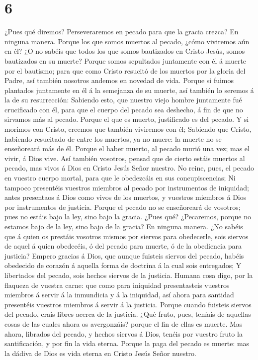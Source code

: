 \hypertarget{section-5}{%
\section{6}\label{section-5}}

 ¿Pues qué diremos? Perseveraremos en pecado para que la
gracia crezca?  En ninguna manera. Porque los que somos
muertos al pecado, ¿cómo viviremos aún en él?  ¿O no
sabéis que todos los que somos bautizados en Cristo Jesús, somos
bautizados en su muerte?  Porque somos sepultados
juntamente con él á muerte por el bautismo; para que como Cristo
resucitó de los muertos por la gloria del Padre, así también nosotros
andemos en novedad de vida.  Porque si fuimos plantados
juntamente en él á la semejanza de su muerte, así también lo seremos á
la de su resurrección:  Sabiendo esto, que nuestro viejo
hombre juntamente fué crucificado con él, para que el cuerpo del pecado
sea deshecho, á fin de que no sirvamos más al pecado. 
Porque el que es muerto, justificado es del pecado.  Y si
morimos con Cristo, creemos que también viviremos con él; 
Sabiendo que Cristo, habiendo resucitado de entre los muertos, ya no
muere: la muerte no se enseñoreará más de él.  Porque el
haber muerto, al pecado murió una vez; mas el vivir, á Dios vive.
 Así también vosotros, pensad que de cierto estáis
muertos al pecado, mas vivos á Dios en Cristo Jesús Señor nuestro.
 No reine, pues, el pecado en vuestro cuerpo mortal, para
que le obedezcáis en sus concupiscencias;  Ni tampoco
presentéis vuestros miembros al pecado por instrumentos de iniquidad;
antes presentaos á Dios como vivos de los muertos, y vuestros miembros á
Dios por instrumentos de justicia.  Porque el pecado no
se enseñoreará de vosotros; pues no estáis bajo la ley, sino bajo la
gracia.  ¿Pues qué? ¿Pecaremos, porque no estamos bajo de
la ley, sino bajo de la gracia? En ninguna manera.  ¿No
sabéis que á quien os prestáis vosotros mismos por siervos para
obedecerle, sois siervos de aquel á quien obedecéis, ó del pecado para
muerte, ó de la obediencia para justicia?  Empero gracias
á Dios, que aunque fuisteis siervos del pecado, habéis obedecido de
corazón á aquella forma de doctrina á la cual sois entregados;
 Y libertados del pecado, sois hechos siervos de la
justicia.  Humana cosa digo, por la flaqueza de vuestra
carne: que como para iniquidad presentasteis vuestros miembros á servir
á la inmundicia y á la iniquidad, así ahora para santidad presentéis
vuestros miembros á servir á la justicia.  Porque cuando
fuisteis siervos del pecado, erais libres acerca de la justicia.
 ¿Qué fruto, pues, teníais de aquellas cosas de las
cuales ahora os avergonzáis? porque el fin de ellas es muerte.
 Mas ahora, librados del pecado, y hechos siervos á Dios,
tenéis por vuestro fruto la santificación, y por fin la vida eterna.
 Porque la paga del pecado es muerte: mas la dádiva de
Dios es vida eterna en Cristo Jesús Señor nuestro.

